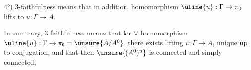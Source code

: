 
4°) \uline{3-faithfulness} means that in addition,  homomorphism \(\uline{u}:\Gamma\to\pi_0\) lifts to \(u:\Gamma\to A\).

In summary,  3-faithfulness means that for \(\forall\) homomorphism \(\uline{u}:\Gamma\to\pi_0=\unsure{A/A^0}\), there exists  lifting \(u:\Gamma\to A\), unique up to conjugation, and that then \(\unsure{(A^0)^u}\) is connected and simply connected,

